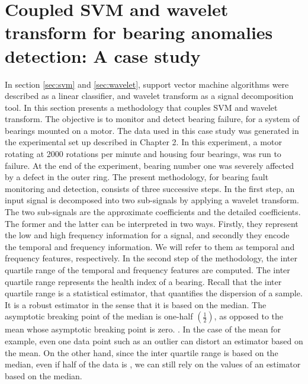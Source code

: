 \documentclass[../Main/thesis.tex]{subfiles}
\begin{document}
\section{Coupled SVM and wavelet transform for bearing anomalies detection: A case study}
\label{sec:result-svm-wavelet}
In section \ref{sec:svm} and \ref{sec:wavelet}, support vector machine algorithms were described as a linear classifier, and wavelet transform as a signal decomposition tool. In this section presents a methodology that couples SVM and wavelet transform. The objective is to monitor and detect bearing failure, for a system of bearings mounted on a motor.
\justify
 The data used in this case study was generated in the experimental set up described in Chapter 2. In this experiment, a motor rotating at 2000 rotations per minute and housing four bearings, was run to failure. At the end of the experiment, bearing number one was severely affected by a defect in the outer ring.
\justify
The present methodology, for bearing fault monitoring and detection, consists of three successive steps. In the first step, an input signal is decomposed into two sub-signals by applying a wavelet transform. The two sub-signals are the approximate coefficients and the detailed coefficients. The former and the latter can be interpreted in two ways. Firstly, they represent the low and high frequency information for a signal, and secondly they encode the temporal and frequency information. We will refer to them as temporal and frequency features, respectively. 
\justify
In the second step of the methodology, the inter quartile range of the temporal and frequency features are computed. The inter quartile range represents the health index of a bearing. Recall that the inter quartile range is a statistical estimator, that quantifies the dispersion of a sample. It is a robust estimator in the sense that it is based on the median. 
\justify
The asymptotic breaking point of the median is one-half $\left(\frac{1}{2}\right)$, as opposed to the mean whose asymptotic breaking point is zero. . In the case of the mean for example, even one  data point such as an outlier can distort an estimator based on the mean. On the other hand, since the inter quartile range is based on the median, even if half of the data is , we can still rely on the values of an estimator based on the median. 
\justify
\end{document}
